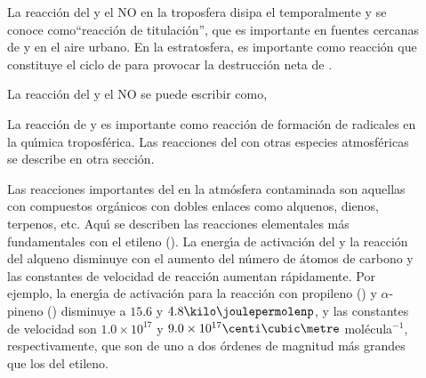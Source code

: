 {\begin{description}
\item[ ]
La reacci\'on del  y el NO en la troposfera disipa el  temporalmente y se conoce como``reacci\'on de titulaci\'on'', que es importante en fuentes cercanas de  y en el aire urbano. En la estratosfera, es importante como reacci\'on que constituye  el ciclo de  para provocar la destrucci\'on neta de .

La reacci\'on del  y el NO se puede escribir como,
\item[ ]
La reacci\'on de  y  es importante como reacci\'on de formaci\'on de radicales  en la qu\'{\i}mica troposf\'erica. Las reacciones del  con otras especies atmosf\'ericas se describe en otra secci\'on.

\item[ ]
Las reacciones importantes del   en la atm\'osfera contaminada son aquellas con compuestos org\'anicos con dobles enlaces como alquenos, dienos, terpenos, etc. Aqu\'{\i} se describen las reacciones elementales m\'as fundamentales con el etileno ().
La energ\'{\i}a de activaci\'on del  y la reacci\'on del alqueno disminuye con el aumento del n\'umero de \'atomos de carbono y las constantes de velocidad de reacci\'on aumentan r\'apidamente. Por ejemplo, la energ\'{\i}a de activaci\'on para la reacci\'on con propileno () y $\alpha$-pineno () disminuye a $15.6$ y $4.8\kilo\joulepermolenp$, y las constantes de velocidad son $1.0\times10^{17}$ y $9.0\times10^{17}\centi\cubic\metre$ mol\'ecula$^{-1}$, respectivamente, que son de uno a dos \'ordenes de magnitud m\'as grandes que los del etileno.


\end{description}}
